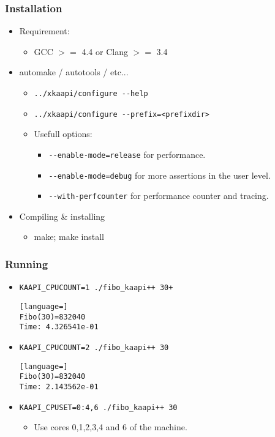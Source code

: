 \begin{frame}[fragile]
  \frametitle{Installation}
  \begin{itemize}
  \item Requirement:
    \begin{itemize}
    \item GCC $>=$ 4.4 or Clang $>=$ 3.4
    \end{itemize}

  \item automake / autotools / etc...
    \begin{itemize}
    \item \verb+../xkaapi/configure --help+
    \item \verb+../xkaapi/configure --prefix=<prefixdir>+
    \item Usefull options:
      \begin{itemize}
      \item \verb+--enable-mode=release+ for performance.
      \item \verb+--enable-mode=debug+ for more assertions in the user level.
      \item \verb+--with-perfcounter+ for performance counter and tracing.
      \end{itemize}
    \end{itemize}
 
    \item Compiling \& installing
      \begin{itemize}
      \item make; make install
      \end{itemize}
  \end{itemize}
\end{frame}
\begin{frame}[fragile]
  \frametitle{Running}
  \begin{itemize}
  \item \verb|KAAPI_CPUCOUNT=1 ./fibo_kaapi++ 30+|
      \begin{block}{}
      \begin{lstlisting}[language=]
Fibo(30)=832040
Time: 4.326541e-01
      \end{lstlisting}
      \end{block}
  \item \verb|KAAPI_CPUCOUNT=2 ./fibo_kaapi++ 30|
      \begin{block}{}
      \begin{lstlisting}[language=]
Fibo(30)=832040
Time: 2.143562e-01
      \end{lstlisting}
      \end{block}
  \item \verb|KAAPI_CPUSET=0:4,6 ./fibo_kaapi++ 30|
    \begin{itemize}
    \item Use cores 0,1,2,3,4 and 6 of the machine.
    \end{itemize}
  \end{itemize}
\end{frame}

